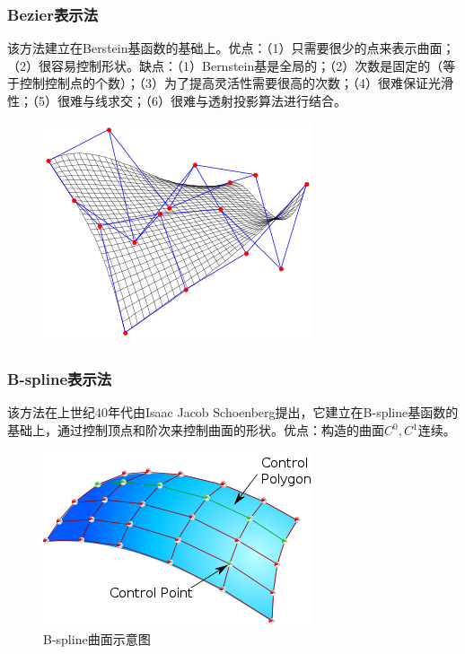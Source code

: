 \documentclass[11pt]{article}
\newcommand{\upcite}[1]{\textsuperscript{\textsuperscript{\cite{#1}}}}
\begin{document}
\subsubsection{Bezier表示法}该方法建立在Berstein基函数的基础上。优点：（1）只需要很少的点来表示曲面；
（2）很容易控制形状。缺点：（1）Bernstein基是全局的；（2）次数是固定的（等于控制控制点的个数）；（3）为了提高灵活性需要很高的次数；（4）很难保证光滑性；（5）很难与线求交；（6）很难与透射投影算法进行结合。
\begin{figure}[H]
\begin{center}
\includegraphics[scale=0.7]{bezier_surface1.png}
\end{center}
\end{figure}


\subsubsection{B-spline表示法\upcite{b-spline0}}该方法在上世纪40年代由Isaac Jacob Schoenberg提出，它建立在B-spline基函数的基础上，通过控制顶点和阶次来控制曲面的形状。优点：构造的曲面$C^0,C^1$连续。
\begin{figure}[H]
\begin{center}
\includegraphics[scale=0.7]{b-spline-surface1.png}
\end{center}
\caption{B-spline曲面示意图}
\end{figure}
\end{document}

